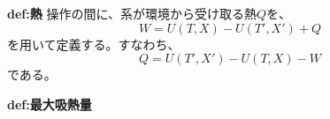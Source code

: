 \documentclass[a4paper,11pt]{jsarticle}
\begin{document}
\begin{itembox}[l]{\textbf{def:熱}}
    操作の間に、系が環境から受け取る熱$Q$を、
    \begin{equation}
        W = U(T,X) - U(T',X') + Q
    \end{equation}
    を用いて定義する。すなわち、
    \begin{equation}
        Q = U(T',X') - U(T,X) - W
    \end{equation}
    である。
\end{itembox}

\begin{itembox}[l]{\textbf{def:最大吸熱量}}
    

\end{itembox}
\end{document}

